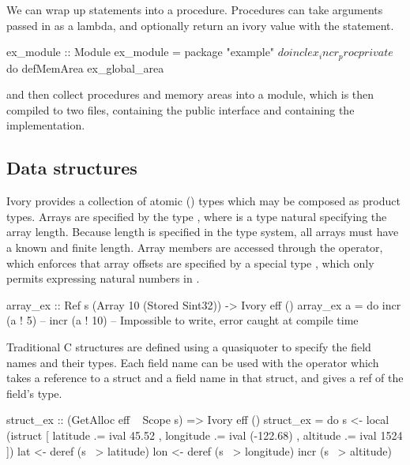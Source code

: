We can wrap up statements into a procedure. Procedures can take arguments
passed in as a lambda, and optionally return an ivory value with the 
statement.

\begin{code}
ex_module :: Module
ex_module = package "example" $ do
  incl ex_incr_proc
  private $ do
    defMemArea ex_global_area
\end{code}

and then collect procedures and memory areas into a module, which is then
compiled to two files,  containing the public interface and
 containing the implementation.

\subsection{Data structures}

Ivory provides a collection of atomic () types which may be composed
as product types. Arrays are specified by the type , where 
is a type natural specifying the array length. Because length is specified in
the type system, all arrays must have a known and finite length. Array
members are accessed through the \cd{!} operator, which enforces that array
offsets are specified by a special type , which only permits expressing
natural numbers in .

\begin{code}
array_ex :: Ref s (Array 10 (Stored Sint32))
         -> Ivory eff ()
array_ex a = do
  incr (a ! 5)
  -- incr (a ! 10) -- Impossible to write, error caught at compile time

\end{code}

Traditional C structures are defined using a quasiquoter to specify the field
names and their types. Each field name can be used with the \cd{~>} operator
which takes a reference to a struct and a field name in that struct, and gives
a ref of the field's type.

\begin{code}

struct_ex :: (GetAlloc eff ~ Scope s) => Ivory eff ()
struct_ex = do
  s <- local (istruct [ latitude .= ival 45.52
                      , longitude .= ival (-122.68)
                      , altitude .= ival 1524 ])
  lat <- deref (s ~> latitude)
  lon <- deref (s ~> longitude)
  incr (s ~> altitude)
\end{code}


